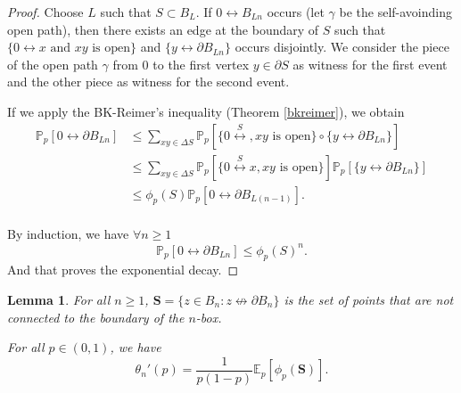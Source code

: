 \documentclass[a4paper,11pt]{article}
\theoremstyle{plain}
\newtheorem{lemma}[theorem]{Lemma}
\theoremstyle{definition}
\theoremstyle{remark}
\begin{document}
\begin{proof}
Choose $L$ such that $S \subset B_L$. If $0 \longleftrightarrow B_{L n}$ occurs (let $\gamma$ be the self-avoinding open path), then there exists an edge at the boundary of $S$ such that $\{0 \longleftrightarrow x \text{ and } xy  \text{ is open}\}$ and $\{y \longleftrightarrow \partial B_{L n}\}$ occurs disjointly. We consider the piece of the open path $\gamma$ from $0$ to the first vertex $y \in \partial S$ as witness for the first event and the other piece as witness for the second event.

If we apply the BK-Reimer's inequality (Theorem \ref{bkreimer}), we obtain
\begin{align*}
    \mathbb{P}_p[0 \longleftrightarrow \partial B_{Ln}] &\leq \sum_{xy \in \Delta S}{\mathbb{P}_p[\{0 \stackrel{S}{\longleftrightarrow}, xy \text{ is open}\}\circ\{y \longleftrightarrow \partial B_{L n}\}]} \\
    &\leq \sum_{xy \in \Delta S}{\mathbb{P}_p[\{0 \stackrel{S}{\longleftrightarrow} x, xy \text{ is open}\}]\mathbb{P}_p[\{y \longleftrightarrow \partial B_{L n}\}]} \\
    &\leq \phi_p(S) \mathbb{P}_p[0 \longleftrightarrow \partial B_{L (n - 1)}]. \\
\end{align*}

By induction, we have $\forall n \geq 1$
\[ \mathbb{P}_p[0 \longleftrightarrow \partial B_{L n}] \leq \phi_p(S)^n.\]
And that proves the exponential decay.
\end{proof}

\begin{lemma} 
\label{secondlemma_expdecay}
For all $n \geq 1$, $\mathbf{S} = \{z \in B_n : z \not\leftrightarrow \partial B_n \}$ is the set of points that are not connected to the boundary of the $n$-box.

For all $p \in (0, 1)$, we have
\[ \theta_n'(p)=\frac{1}{p(1-p)}\mathbb{E}_p[\phi_p(\mathbf{S})]. \]
\end{lemma}
\end{document}
